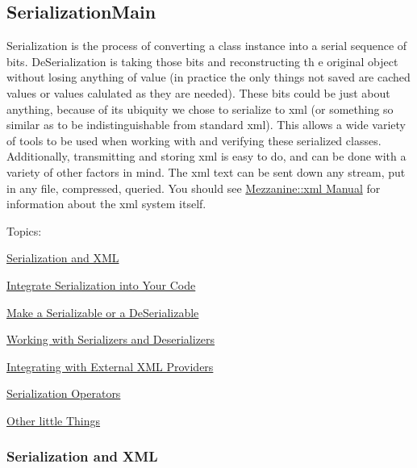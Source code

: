 \hypertarget{Serialization_SerializationMain}{}\subsection{SerializationMain}\label{Serialization_SerializationMain}
Serialization is the process of converting a class instance into a serial sequence of bits. DeSerialization is taking those bits and reconstructing th e original object without losing anything of value (in practice the only things not saved are cached values or values calulated as they are needed). These bits could be just about anything, because of its ubiquity we chose to serialize to xml (or something so similar as to be indistinguishable from standard xml). This allows a wide variety of tools to be used when working with and verifying these serialized classes. Additionally, transmitting and storing xml is easy to do, and can be done with a variety of other factors in mind. The xml text can be sent down any stream, put in any file, compressed, queried. You should see \hyperlink{XMLManual}{Mezzanine::xml Manual} for information about the xml system itself. \par
 \par
 Topics:
\begin{DoxyItemize}
\item \hyperlink{Serialization_serializationxml}{Serialization and XML}
\item \hyperlink{Serialization_serializationintegration}{Integrate Serialization into Your Code}
\begin{DoxyItemize}
\item \hyperlink{Serialization_serializationmaking}{Make a Serializable or a DeSerializable}
\item \hyperlink{Serialization_serializationserializers}{Working with Serializers and Deserializers}
\item \hyperlink{Serialization_serializationlegacy}{Integrating with External XML Providers}
\end{DoxyItemize}
\item \hyperlink{Serialization_serializationoperators}{Serialization Operators}
\item \hyperlink{Serialization_serializationmisc}{Other little Things} 
\end{DoxyItemize}\hypertarget{Serialization_serializationxml}{}\subsubsection{Serialization and XML}\label{Serialization_serializationxml}
